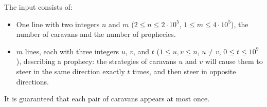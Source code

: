 
The input consists of:
\begin{itemize}
	\item One line with two integers $n$ and $m$ ($2\leq n\leq 2 \cdot 10^5$, $1\leq m\leq4 \cdot 10^5$), the number of caravans and the number of prophecies.
	\item $m$ lines, each with three integers $u$, $v$, and $t$ ($1\leq u, v\leq n$, $u\neq v$, $0\leq t\leq 10^9$), describing a prophecy:
	the strategies of caravans $u$ and $v$ will cause them to steer in the same direction exactly $t$ times, and then steer in opposite directions.
\end{itemize}
It is guaranteed that each pair of caravans appears at most once.
